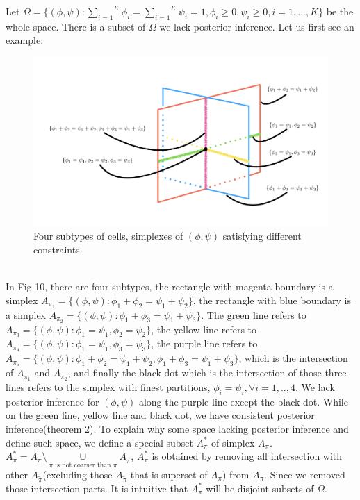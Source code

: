 \documentclass[aoas,preprint]{imsart}
\begin{document}
Let $\Omega = \{(\phi, \psi): \overset{K}{\underset{i = 1}\sum}\phi_i = \overset{K}{\underset{i = 1}\sum}\psi_i = 1, \phi_i \geq 0, \psi_i \geq 0 , i = 1,..., K\}$ be the whole space. There is a subset of $\Omega$ we lack posterior inference. Let us first see an example:
\begin{figure}[h]
\includegraphics[scale = 0.5]{Figs/overlap.png}
 \caption{Four subtypes of cells,  simplexes of $(\phi,\psi)$ satisfying different constraints.}
  \label{fig:1}
\end{figure}
\hfill\\
In Fig 10, there are four subtypes, the rectangle with magenta boundary is a simplex $A_{\pi_1} = \{(\phi,\psi) : \phi_1 + \phi_2 = \psi_1 + \psi_2\}$, the rectangle with blue boundary is a simplex $A_{\pi_2} = \{(\phi,\psi) : \phi_1 + \phi_3 = \psi_1 + \psi_3\}$. The green line refers to $A_{\pi_3} = \{(\phi,\psi) : \phi_1 = \psi_1, \phi_2 = \psi_2\}$, the yellow line refers to $A_{\pi_4} = \{(\phi,\psi) : \phi_1 = \psi_1, \phi_3 = \psi_3\}$, the purple line refers to $A_{\pi_5} = \{(\phi,\psi) : \phi_1 + \phi_2 = \psi_1 + \psi_2, \phi_1 + \phi_3 = \psi_1 + \psi_3\}$, which is the intersection of $A_{\pi_1}$ and $A_{\pi_2}$, and finally the black dot which is the intersection of those three lines refers to the simplex with finest partitions, $\phi_i = \psi_i, \forall i = 1,..,4$. We lack posterior inference for $(\phi,\psi)$ along the purple line except the black dot. While on the green line, yellow line and black dot, we have consistent posterior inference(theorem 2). To explain why some space lacking posterior inference and define such space, we define a special subset $A_\pi^*$ of simplex $A_\pi$. $A_\pi^* = A_\pi\setminus \underset{\tilde{\pi} \text{ is not coarser than } \pi }\cup A_{\tilde{\pi}}$, $A_\pi^*$ is obtained by removing all intersection with other $A_{\tilde{\pi}}$(excluding those $A_{\tilde{\pi}}$ that is superset of $A_\pi$) from $A_\pi$. Since we removed those intersection parts. It is intuitive that $A_\pi^*$ will be disjoint subsets of $\Omega$.\\
\end{document}
